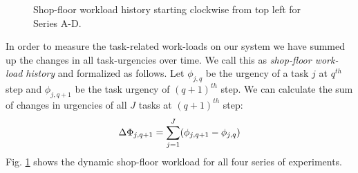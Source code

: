 \documentclass[journal]{IEEEtran}
\begin{document}
\begin{figure}
\centering
{}
\newline
{}
\centering
\newline
{}
\newline
{}
\newline
\caption{\small Shop-floor workload history starting clockwise from top left for Series A-D.}
\label{fig:urgency-stat}
\vspace*{-0.6cm}
\end{figure}
In order to measure the task-related work-loads on our system we have summed up the changes in all task-urgencies over time. We call this as {\em shop-floor work-load history} and formalized as follows. Let $ \phi_{j, q}$ be the urgency of a task $j$ at $q^{th}$ step and $\phi_{j, q+1}$ be the task urgency of $(q+1)^{th}$ step. We can calculate the sum of changes in urgencies of all $J$ tasks at $(q+1)^{th}$ step:
\begin{equation} 
\begin{small}
\Delta \Phi_{j, q+1} = \sum_{j=1}^{J} (\phi_{j, q+1} - \phi_{j, q})
\label{eqn:Delta-Phi}
\end{small}
\end{equation}
Fig. \ref{fig:urgency-stat} shows the dynamic shop-floor workload for all four series of experiments. 
\vspace*{-0.3cm}
\end{document}
